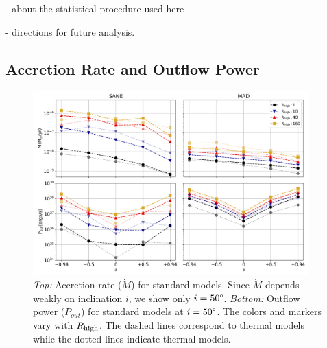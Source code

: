 - about the statistical procedure used here

- directions for future analysis.

\subsection{Accretion Rate and Outflow Power}


\begin{figure}
\centering
\includegraphics[width=0.95\textwidth]{figures/bhac_kharma_average_mdot_pout.png}
\caption{{\it Top:} Accretion rate ($\dot{M}$) for standard models. Since $\dot{M}$ depends weakly on inclination $i$, we show only $i=50\degree$. {\it Bottom:} Outflow power ($P_{out}$) for standard models at $i = 50\degree$. The colors and markers vary with $R_\mathrm{high}$. The dashed lines correspond to \kharma thermal models while the dotted lines indicate \bhac thermal models.}
\label{fig:accretion_outflow_power_illinois_thermal}
\end{figure}

